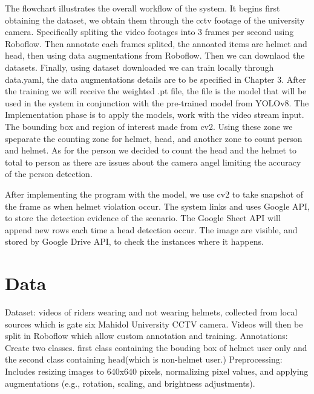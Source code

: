	 The flowchart illustrates the overall workflow of the system. It begins first obtaining the dataset, we obtain them through the cctv footage of the university camera. Specifically spliting the video footages into 3 frames per second using Roboflow. Then annotate each frames splited, the annoated items are helmet and head, then using data augmentations from Roboflow. Then we can downlaod the datasets. Finally, using dataset downloaded we can train locally through data.yaml, the data augmentations details are to be specified in Chapter 3. After the training we will receive the weighted .pt file, the file is the model that will be used in the system in conjunction with the pre-trained model from YOLOv8. The Implementation phase is to apply the models, work with the video stream input. The bounding box and region of interest made from cv2. Using these zone we speparate the counting zone for helmet, head, and another zone to count person and helmet. As for the person we decided to count the head and the helmet to total to person as there are issues about the camera angel limiting the accuracy of the person detection. 
	
	After implementing the program with the model, we use cv2 to take snapshot of the frame as when helmet violation occur. The system links and uses Google API, to store the detection evidence of the scenario. The Google Sheet API will append new rows each time a head detection occur.  The image are visible, and stored by Google Drive API, to check the instances where it happens.
	
\section{Data}
Dataset: videos of riders wearing and not wearing helmets, collected from local sources which is gate six Mahidol University CCTV camera. Videos will then be split in Roboflow which allow custom annotation and training.
\newline
\newline
Annotations: Create two classes. first class containing the bouding box of helmet user only and the second class containing head(which is non-helmet user.)
\newline
Preprocessing: Includes resizing images to 640x640 pixels, normalizing pixel values, and applying augmentations (e.g., rotation, scaling, and brightness adjustments).

\newpage
